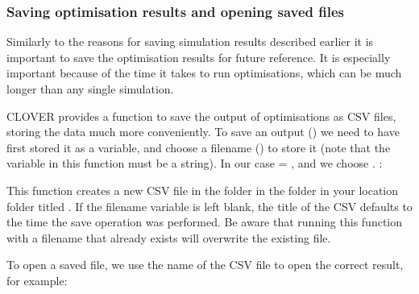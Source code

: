 \documentclass[letterpaper,10pt,english]{sphinxmanual}
\begin{document}
\subsubsection{Saving optimisation results and opening saved files}
\label{\detokenize{optimisation:saving-optimisation-results-and-opening-saved-files}}
\sphinxAtStartPar
Similarly to the reasons for saving simulation results described earlier
it is
important to save the optimisation results for future reference. It is
especially important because of the time it takes to run optimisations,
which can be much longer than any single simulation.

\sphinxAtStartPar
CLOVER provides a function to save the output of optimisations as CSV
files, storing the data much more conveniently. To save an output
() we need to have first stored it as a variable,
and choose a filename () to store it (note that the
 variable in this function must be a string). In our case
 = , and we choose
. :

\begin{sphinxVerbatim}[commandchars=\\\{\}]
  
          
\end{sphinxVerbatim}

\sphinxAtStartPar
This function creates a new CSV file in the  folder
in the  folder in your location folder titled
. If the filename variable is left blank,
the title of the CSV defaults to the time the save operation was
performed. Be aware that running this function with a filename that
already exists will overwrite the existing file.

\sphinxAtStartPar
To open a saved file, we use the name of the CSV file to open the
correct result, for example:
\end{document}
